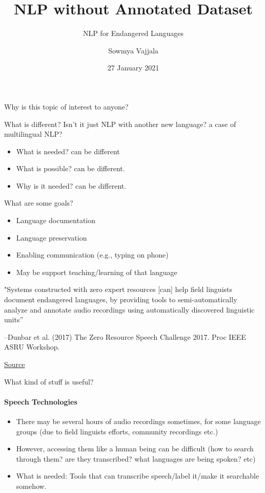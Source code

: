\documentclass{beamer}
\author[Sowmya Vajjala]{Sowmya Vajjala}
\title[SfSNLP]{NLP without Annotated Dataset}
\subtitle{NLP for Endangered Languages}
\date{27 January 2021}
\institute{Seminar f\"ur Sprachwissenschaft, University of T\"ubingen, Germany}
\begin{document}
\begin{frame}\titlepage
\end{frame}

\begin{frame}{}
    \Large Why is this topic of interest to anyone?
\end{frame}

\begin{frame}{What is different?}
Isn't it just NLP with another new language? a case of multilingual NLP? \pause
    \begin{itemize}
        \item What is needed? can be different 
        \item What is possible? can be different.
        \item Why is it needed? can be different.
    \end{itemize}
\end{frame}

\begin{frame}{What are some goals?}
    \begin{itemize}
        \item Language documentation
        \item Language preservation
        \item Enabling communication (e.g., typing on phone)
        \item May be support teaching/learning of that language
    \end{itemize}
\end{frame}

\begin{frame}{}
    "Systems constructed with zero expert resources [can] help
field linguists document endangered languages, by providing
tools to semi-automatically analyze and annotate audio
recordings using automatically discovered linguistic units”

–Dunbar et al. (2017) The Zero Resource Speech Challenge
2017. Proc IEEE ASRU Workshop.

\href{https://www.aclweb.org/anthology/2020.coling-main.313/}{Source}
\end{frame}

\begin{frame}{What kind of stuff is useful?}
\framesubtitle{Speech Technologies}
    \begin{itemize}
        \item There may be several hours of audio recordings sometimes, for some language groups (due to field linguists efforts, community recordings etc.)
        \item However, accessing them like a human being can be difficult (how to search through them? are they transcribed? what languages are being spoken? etc) \pause
        \item What is needed: Tools that can transcribe speech/label it/make it searchable somehow.
    \end{itemize}
\end{frame}
\end{document}

